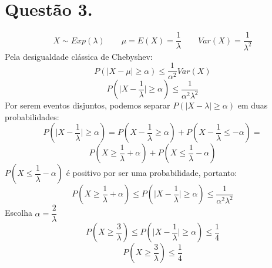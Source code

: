 \documentclass[12pt]{article}
\begin{document}
\section{Questão 3.}

\[X \sim Exp(\lambda) \qquad \mu = E(X) = \dfrac{1}{\lambda} \qquad Var(X) = \dfrac{1}{\lambda^{2}}\]
Pela desigualdade clássica de Chebyshev:
\[P(|X-\mu| \geq \alpha) \leq \dfrac{1}{\alpha^{2}} Var(X)\]
\[P\left( \biggr| X-\dfrac{1}{\lambda} \biggr| \geq \alpha \right) \leq \dfrac{1}{\alpha^{2}\lambda^{2}}\]
Por serem eventos disjuntos, podemos separar $P(|X-\lambda| \geq \alpha)$ em duas probabilidades:
\[P\left( \biggr| X-\dfrac{1}{\lambda} \biggr| \geq \alpha \right) = P\left( X-\dfrac{1}{\lambda} \geq \alpha \right) + P\left( X-\dfrac{1}{\lambda} \leq -\alpha \right) =\]
\[P\left( X \geq \dfrac{1}{\lambda}+\alpha \right) + P\left( X \leq \dfrac{1}{\lambda}-\alpha \right)\]
$P\left( X \leq \dfrac{1}{\lambda}-\alpha \right)$ é positivo por ser uma probabilidade, portanto:
\[P\left( X \geq \dfrac{1}{\lambda}+\alpha \right) \leq P\left( \biggr| X-\dfrac{1}{\lambda} \biggr| \geq \alpha \right) \leq \dfrac{1}{\alpha^{2}\lambda^{2}}\]
Escolha $\alpha = \dfrac{2}{\lambda}$
\[P\left( X \geq \dfrac{3}{\lambda} \right) \leq P\left( \biggr| X-\dfrac{1}{\lambda} \biggr| \geq \alpha \right) \leq \dfrac{1}{4}\]
\[P\left( X \geq \dfrac{3}{\lambda} \right) \leq \dfrac{1}{4}\]
\end{document}
